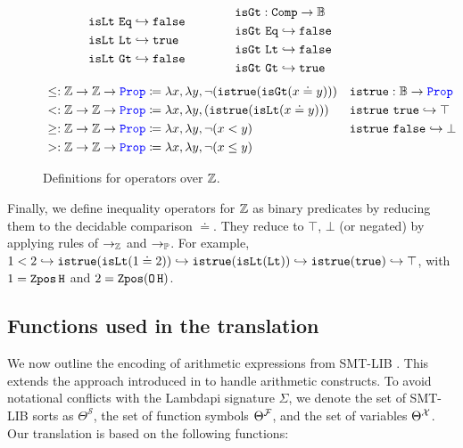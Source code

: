 \begin{figure}
\[\begin{array}{l@{\hspace{4em}}l@{\hspace{4em}}l}
\begin{aligned}
  &\tt{isLt}~\tt{Eq} \re \tt{false} \\
  &\tt{isLt}~\tt{Lt} \re \tt{true} \\
  &\tt{isLt}~\tt{Gt} \re \tt{false} \\
\end{aligned}
&
\begin{aligned}
  &\tt{isGt} : \tt{Comp} \ra \bb{B} \\
  &\tt{isGt}~\tt{Eq} \re \tt{false} \\
  &\tt{isGt}~\tt{Lt} \re \tt{false} \\
  &\tt{isGt}~\tt{Gt} \re \tt{true} 
\end{aligned}
\end{array}
\]
\noindent
\begin{align*}
&\leq: \bb{Z} \ra \bb{Z} \ra \prop  \coloneq \lambda x,\lambda y, \neg (\tt{istrue}(\tt{isGt}(x \doteq y))) & &\tt{istrue} : \bb{B} \ra \prop \\
&<: \bb{Z} \ra \bb{Z} \ra \prop  \coloneq \lambda x,\lambda y, (\tt{istrue}(\tt{isLt}(x \doteq y))) & &\tt{istrue}~\tt{true} \re \top \\
&\geq: \bb{Z} \ra \bb{Z} \ra \prop  \coloneq \lambda x,\lambda y, \neg (x < y) & &\tt{istrue}~\tt{false} \re \bot \\
&>: \bb{Z} \ra \bb{Z} \ra \prop  \coloneq \lambda x,\lambda y, \neg (x \leq y) & &
\end{align*}
\caption{Definitions for operators over $\bb{Z}$.}
\label{fig:arith-ops}
\end{figure}

Finally, we define inequality operators for $\bb{Z}$ as binary predicates by reducing them to the decidable comparison $\doteq$. They reduce to $\top$, $\bot$ (or negated) by applying rules of $\ra_\bb{Z}$ and $\ra_\bb{P}$.
For example, $1 < 2 \hookrightarrow \tt{istrue}(\tt{isLt}(1 \doteq 2)) \hookrightarrow \tt{istrue}(\tt{isLt}(\tt{Lt})) \hookrightarrow \tt{istrue}(\tt{true}) \hookrightarrow \top$, with $1 = \mathop{\tt{Zpos}} \tt{H}$ and $2 = \mathop{\tt{Zpos}} (\mathop{\tt{O}} \tt{H})$.

\subsection{Functions used in the translation}

We now outline the encoding of arithmetic expressions from SMT-LIB \cite[\S 5.2.1]{smtlib}. This extends the approach introduced in \cite{ColtellacciMD24} to handle arithmetic constructs.
To avoid notational conflicts with the Lambdapi signature $\Sigma$, we denote the set of SMT-LIB sorts as $\Theta^\mathcal{S}$, the set of function symbols $\Theta^\cal{F}$, and the set of variables $\Theta^\cal{X}$.
Our translation is based on the following functions:

